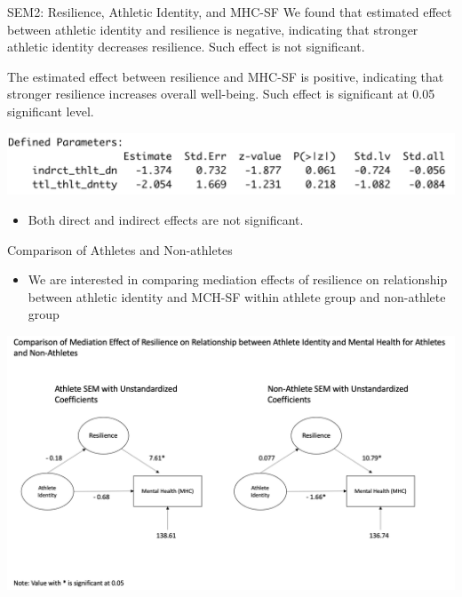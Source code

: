 \documentclass[
  ignorenonframetext,
]{beamer}
\providecommand{\tightlist}{%
  \setlength{\itemsep}{0pt}\setlength{\parskip}{0pt}}
\begin{document}
\begin{frame}{SEM2: Resilience, Athletic Identity, and MHC-SF}
\protect\hypertarget{sem2-resilience-athletic-identity-and-mhc-sf}{}
We found that estimated effect between athletic identity and resilience
is negative, indicating that stronger athletic identity decreases
resilience. Such effect is not significant.

The estimated effect between resilience and MHC-SF is positive,
indicating that stronger resilience increases overall well-being. Such
effect is significant at 0.05 significant level.

\centering

\includegraphics{images/standardized_direct_indirect.png}

\begin{itemize}
\tightlist
\item
  Both direct and indirect effects are not significant.
\end{itemize}
\end{frame}

\begin{frame}{Comparison of Athletes and Non-athletes}
\protect\hypertarget{comparison-of-athletes-and-non-athletes}{}
\begin{itemize}
\tightlist
\item
  We are interested in comparing mediation effects of resilience on
  relationship between athletic identity and MCH-SF within athlete group
  and non-athlete group
\end{itemize}

\centering

\includegraphics{images/SEM_3.png}
\end{frame}
\end{document}
